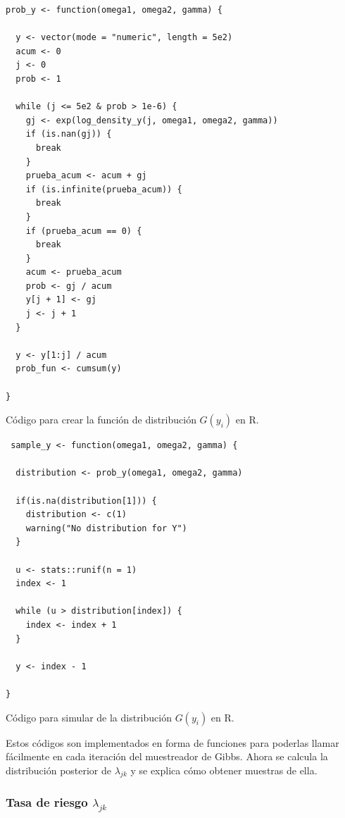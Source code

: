 \documentclass[11pt,a4paper]{article}
\begin{document}
\begin{table}[!htb]
\begin{lstlisting}
prob_y <- function(omega1, omega2, gamma) {

  y <- vector(mode = "numeric", length = 5e2)
  acum <- 0
  j <- 0
  prob <- 1

  while (j <= 5e2 & prob > 1e-6) {
    gj <- exp(log_density_y(j, omega1, omega2, gamma))
    if (is.nan(gj)) {
      break
    }
    prueba_acum <- acum + gj
    if (is.infinite(prueba_acum)) {
      break
    }
    if (prueba_acum == 0) {
      break
    }
    acum <- prueba_acum
    prob <- gj / acum
    y[j + 1] <- gj
    j <- j + 1
  }

  y <- y[1:j] / acum
  prob_fun <- cumsum(y)

}
\end{lstlisting}
\caption{Código para crear la función de distribución $G(y_i)$ en R. }
\label{cod:dist_y}
\end{table}

\begin{table}[!htb]
\begin{lstlisting}
 sample_y <- function(omega1, omega2, gamma) {

  distribution <- prob_y(omega1, omega2, gamma)

  if(is.na(distribution[1])) {
    distribution <- c(1)
    warning("No distribution for Y")
  }

  u <- stats::runif(n = 1)
  index <- 1

  while (u > distribution[index]) {
    index <- index + 1
  }

  y <- index - 1

}
\end{lstlisting}
\caption{Código para simular de la distribución $G(y_i)$ en R. }
\label{cod:sim_y}
\end{table}

Estos códigos son implementados en forma de funciones para poderlas llamar fácilmente en cada iteración del muestreador de Gibbs. Ahora se calcula la distribución posterior de $\lambda_{jk}$ y se explica cómo obtener muestras de ella.

\subsubsection*{Tasa de riesgo $\lambda_{jk}$}
\label{posterior_lambda}
\end{document}
